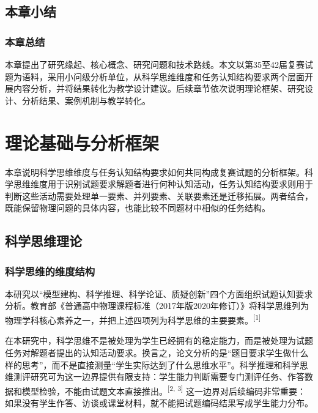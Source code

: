 \documentclass[
  12pt,
  a4paper]{ctexbook}
\begin{document}
\section{本章小结}\label{ux672cux7ae0ux5c0fux7ed3}

\subsection{本章总结}\label{ux672cux7ae0ux603bux7ed3}

本章提出了研究缘起、核心概念、研究问题和技术路线。本文以第35至42届复赛试题为语料，采用小问级分析单位，从科学思维维度和任务认知结构要求两个层面开展内容分析，并将结果转化为教学设计建议。后续章节依次说明理论框架、研究设计、分析结果、案例机制与教学转化。

\chapter{理论基础与分析框架}\label{ux7406ux8bbaux57faux7840ux4e0eux5206ux6790ux6846ux67b6}

本章说明科学思维维度与任务认知结构要求如何共同构成复赛试题的分析框架。科学思维维度用于识别试题要求解题者进行何种认知活动，任务认知结构要求则用于判断这些活动需要处理单一要素、并列要素、关联要素还是迁移拓展。两者结合，既能保留物理问题的具体内容，也能比较不同题材中相似的任务结构。

\section{科学思维理论}\label{ux79d1ux5b66ux601dux7ef4ux7406ux8bba}

\subsection{科学思维的维度结构}\label{ux79d1ux5b66ux601dux7ef4ux7684ux7ef4ux5ea6ux7ed3ux6784}

本研究以``模型建构、科学推理、科学论证、质疑创新''四个方面组织试题认知要求分析。教育部《普通高中物理课程标准（2017年版2020年修订）》将科学思维列为物理学科核心素养之一，并把上述四项列为科学思维的主要要素。\textsuperscript{[1]}

在本研究中，科学思维不是被处理为学生已经拥有的稳定能力，而是被处理为试题任务对解题者提出的认知活动要求。换言之，论文分析的是``题目要求学生做什么样的思考''，而不是直接测量``学生实际达到了什么思维水平''。科学推理和科学思维测评研究可为这一边界提供有限支持：学生能力判断需要专门测评任务、作答数据和模型检验，不能由试题文本直接推出。\textsuperscript{[2, 3]}
这一边界对后续编码非常重要：如果没有学生作答、访谈或课堂材料，就不能把试题编码结果写成学生能力分布。
\end{document}
